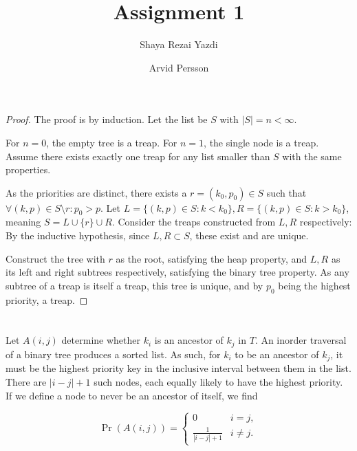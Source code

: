 \documentclass{article}
\title{Assignment 1}
\author{Shaya Rezai Yazdi \and Arvid Persson}
\begin{document}
\maketitle

\section{}

\begin{proof}
    The proof is by induction. Let the list be $S$ with $|S| = n < \infty$.

    For $n = 0$, the empty tree is a treap. For $n = 1$, the single node is a
    treap. Assume there exists exactly one treap for any list smaller than $S$
    with the same properties.

    As the priorities are distinct, there exists a $r = (k_0, p_0) \in S$ such
    that $\forall (k, p) \in S \setminus r: p_0 > p$. Let $L = \{ (k, p) \in S:
    k < k_0 \}, R = \{ (k, p) \in S: k > k_0 \}$, meaning $S = L \cup \{r\}
    \cup R$. Consider the treaps constructed from $L, R$ respectively: By the
    inductive hypothesis, since $L, R \subset S$, these exist and are unique.

    Construct the tree with $r$ as the root, satisfying the heap property, and
    $L, R$ as its left and right subtrees respectively, satisfying the binary
    tree property. As any subtree of a treap is itself a treap, this tree is
    unique, and by $p_0$ being the highest priority, a treap.
\end{proof}

\section{}

Let $A(i, j)$ determine whether $k_i$ is an ancestor of $k_j$ in $T$. An
inorder traversal of a binary tree produces a sorted list. As such, for $k_i$
to be an ancestor of $k_j$, it must be the highest priority key in the
inclusive interval between them in the list. There are $|i - j| + 1$ such
nodes, each equally likely to have the highest priority. If we define a node to
never be an ancestor of itself, we find

\begin{equation*}
    \Pr(A(i, j)) =
    \begin{cases}
	0 & i = j, \\
	\frac{1}{|i - j| + 1} & i \neq j.
    \end{cases}
\end{equation*}
\end{document}
